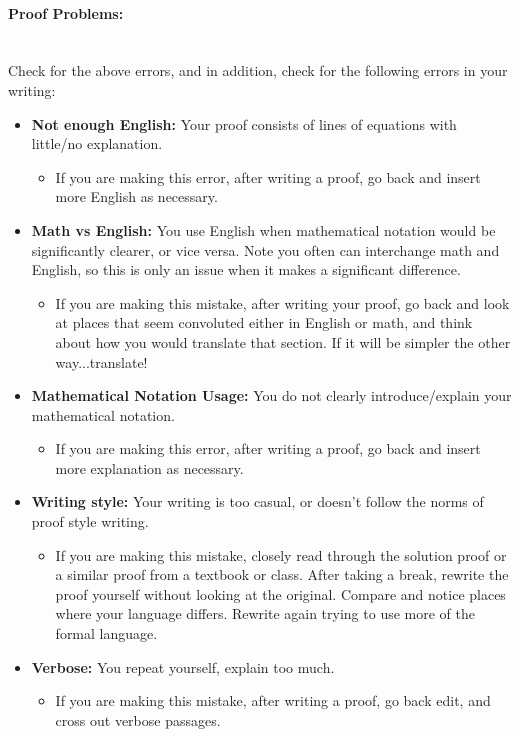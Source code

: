 \documentclass[12pt]{article}
\theoremstyle{definition}
\begin{document}
\paragraph{{\Large{Proof Problems:}}}

~\\Check for the above errors, and in addition, check for the following errors in your writing:
\begin{itemize}
\item \textbf{Not enough English:} Your proof consists of lines of equations with little/no explanation.
\begin{itemize}
\item  If you are making this error, after writing a proof, go back and insert more English as necessary.
\end{itemize}

\item \textbf{Math vs English:} You use English when mathematical notation would be significantly clearer, or vice versa. Note you often can interchange math and English, so this is only an issue when it makes a significant difference. 
\begin{itemize}
\item 
If you are making this mistake, after writing your proof, go back and look at places that seem convoluted either in English or math, and think about how you would translate that section. If it will be simpler the other way...translate!
\end{itemize}
\item \textbf{Mathematical Notation Usage:} You do not clearly introduce/explain your mathematical notation.
\begin{itemize}
\item  If you are making this error, after writing a proof, go back and insert more explanation as necessary.
\end{itemize}
\item \textbf{Writing style:} Your writing is too casual, or doesn't follow the norms of proof style writing.
\begin{itemize}
\item  If you are making this mistake, closely read through the solution proof or a similar proof from a textbook or class. After taking a break, rewrite the proof yourself without looking at the original. Compare and notice places where your language differs. Rewrite again trying to use more of the formal language.
\end{itemize} 
\item \textbf{Verbose:} You repeat yourself, explain too much.
\begin{itemize}
\item  If you are making this mistake, after writing a proof, go back edit, and cross out verbose passages.
\end{itemize}  
\end{itemize}
\end{document}
